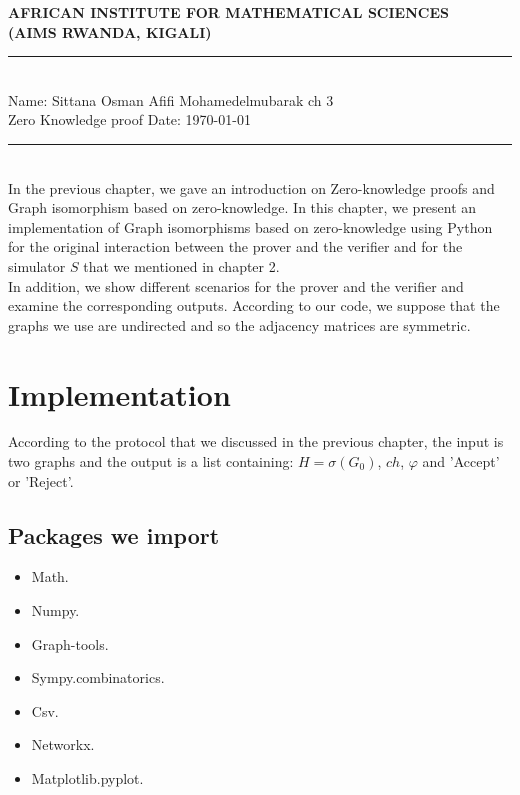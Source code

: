 \documentclass[12pt,a4paper]{article}
\begin{document}


\thispagestyle{empty}
\begin{center}
\textbf{AFRICAN INSTITUTE FOR MATHEMATICAL SCIENCES \\[0.5cm]
(AIMS RWANDA, KIGALI)}
\vspace{1.0cm}
\end{center}

\noindent
\rule{17cm}{0.2cm}\\[0.3cm]
Name: Sittana Osman Afifi Mohamedelmubarak \hfill  ch 3\\[0.1cm]
Zero Knowledge proof  \hfill Date: \today\\
\rule{17cm}{0.05cm}
\vspace{1.0cm}
\\
In the previous chapter, we gave an introduction on Zero-knowledge proofs and Graph isomorphism based on zero-knowledge. In this chapter, we present an implementation of Graph isomorphisms based on zero-knowledge using Python for the original interaction between the prover and the verifier and for the simulator $S$ that we mentioned in chapter 2.\\
In addition, we show different scenarios for the prover and the verifier and examine the corresponding outputs.
According to our code, we suppose that the graphs we use are undirected and so the adjacency matrices are symmetric.
\section{Implementation}
According to the protocol that we discussed in the previous chapter, the input is two graphs and the output is a list containing:
$H=\sigma(G_0)$, $ch$, $\varphi$ and ’Accept’ or ’Reject’.
\subsection{Packages we import}
\begin{itemize}
	\item Math.
	\item Numpy.
	\item Graph-tools.
	\item Sympy.combinatorics.
	\item Csv.
	\item Networkx.
	\item Matplotlib.pyplot.
\end{itemize}
\end{document}
